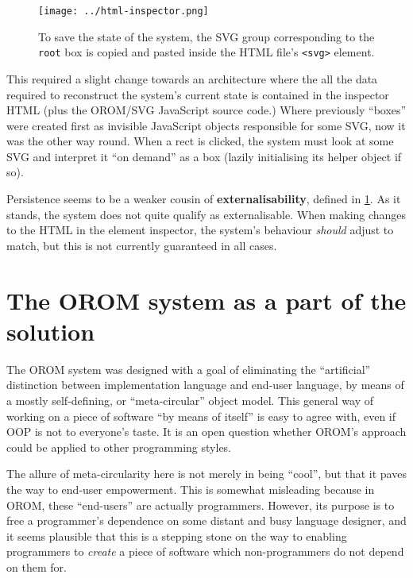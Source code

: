 \begin{figure}[h]
  \centering
  \texttt{[image: ../html-inspector.png]}
  \caption{To save the state of the system, the SVG group corresponding to the \texttt{root} box is copied and pasted inside the HTML file's \texttt{\textless{}svg\textgreater{}} element.\label{fig:html-inspector}}
\end{figure}

This required a slight change towards an architecture where the all the
data required to reconstruct the system's current state is contained in
the inspector HTML (plus the OROM/SVG JavaScript source code.) Where
previously ``boxes'' were created first as invisible JavaScript objects
responsible for some SVG, now it was the other way round. When a rect is
clicked, the system must look at some SVG and interpret it ``on demand''
as a box (lazily initialising its helper object if so).

Persistence seems to be a weaker cousin of \textbf{externalisability},
defined in \href{antranig}{1}. As it stands, the system does not quite
qualify as externalisable. When making changes to the HTML in the
element inspector, the system's behaviour \emph{should} adjust to match,
but this is not currently guaranteed in all cases.

\hypertarget{the-orom-system-as-a-part-of-the-solution}{%
\section{The OROM system as a part of the
solution}\label{the-orom-system-as-a-part-of-the-solution}}

The OROM system was designed with a goal of eliminating the
``artificial'' distinction between implementation language and end-user
language, by means of a mostly self-defining, or ``meta-circular''
object model. This general way of working on a piece of software ``by
means of itself'' is easy to agree with, even if OOP is not to
everyone's taste. It is an open question whether OROM's approach could
be applied to other programming styles.

The allure of meta-circularity here is not merely in being ``cool'', but
that it paves the way to end-user empowerment. This is somewhat
misleading because in OROM, these ``end-users'' are actually
programmers. However, its purpose is to free a programmer's dependence
on some distant and busy language designer, and it seems plausible that
this is a stepping stone on the way to enabling programmers to
\emph{create} a piece of software which non-programmers do not depend on
them for.

